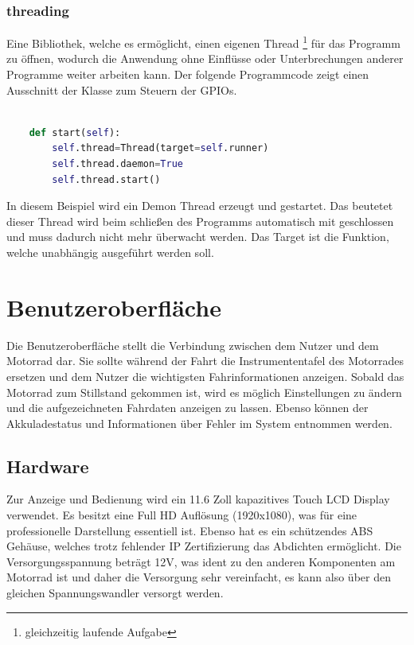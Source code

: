 \subsubsection{threading}

Eine Bibliothek, welche es ermöglicht, einen eigenen Thread \footnote{gleichzeitig laufende Aufgabe} für das Programm zu öffnen, wodurch die Anwendung ohne Einflüsse oder Unterbrechungen anderer Programme weiter arbeiten kann. Der folgende Programmcode zeigt einen Ausschnitt der Klasse zum Steuern der GPIOs. 

\begin{lstlisting}[language=Python, caption={Code zum Starten eines Threads},captionpos=b]
	
	def start(self):
		self.thread=Thread(target=self.runner)
		self.thread.daemon=True
		self.thread.start()

\end{lstlisting}

In diesem Beispiel wird ein Demon Thread erzeugt und gestartet. Das beutetet dieser Thread wird beim schließen des Programms automatisch mit geschlossen und muss dadurch nicht mehr überwacht werden. Das Target ist die Funktion, welche unabhängig ausgeführt werden soll.

\newpage


\section{Benutzeroberfläche}
Die Benutzeroberfläche stellt die Verbindung zwischen dem Nutzer und dem Motorrad dar. Sie sollte während der Fahrt die Instrumententafel des Motorrades ersetzen und dem Nutzer die wichtigsten Fahrinformationen anzeigen. Sobald das Motorrad zum Stillstand gekommen ist, wird es möglich Einstellungen zu ändern und die aufgezeichneten Fahrdaten anzeigen zu lassen. Ebenso können der Akkuladestatus und Informationen über Fehler im System entnommen werden.

\subsection{Hardware}

Zur Anzeige und Bedienung wird ein 11.6 Zoll kapazitives Touch LCD Display verwendet. Es besitzt eine Full HD Auflösung (1920x1080), was für eine professionelle Darstellung essentiell ist. Ebenso hat es ein schützendes ABS Gehäuse, welches trotz fehlender IP Zertifizierung das Abdichten ermöglicht. Die Versorgungsspannung beträgt 12V, was ident zu den anderen Komponenten am Motorrad ist und daher die Versorgung sehr vereinfacht, es kann also über den gleichen Spannungswandler versorgt werden.

